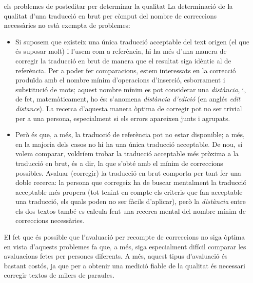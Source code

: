 \begin{persabermes}{els problemes de posteditar per determinar la qualitat}
  La determinació de la qualitat d'una traducció en brut per còmput
  del nombre de correccions necessàries no està exempta de problemes:
\begin{itemize}
\item Si suposem que existeix una única traducció acceptable del text
  origen (el que és suposar molt) i l'usem com a referència, hi ha més
  d'una manera de corregir la traducció en brut de manera que el
  resultat siga idèntic al de referència. Per a poder fer
  comparacions, estem interessats en la correcció produïda amb el
  nombre mínim d'operacions d'inserció, esborrament i substitució de
  mots; aquest nombre mínim es pot considerar una \emph{distància}, i,
  de fet, matemàticament, ho és: s'anomena \emph{distància d'edició}
  (en anglés \emph{edit distance}). La recerca d'aquesta manera òptima
  de corregir pot no ser trivial per a una persona, especialment si
  els errors apareixen junts i agrupats.
\item Però és que, a més, la traducció de referència pot no estar
  disponible; a més, en la majoria dels casos no hi ha una única
  traducció acceptable. De nou, si volem comparar, voldríem trobar la
  traducció acceptable més pròxima a la traducció en brut, és a dir,
  la que s'obté amb el mínim de correccions possibles. Avaluar
  (corregir) la traducció en brut comporta per tant fer una doble
  recerca: la persona que corregeix ha de buscar mentalment la
  traducció acceptable més propera (tot tenint en compte els criteris
  que fan acceptable una traducció, els quals poden no ser fàcils
  d'aplicar), però la \emph{distància} entre els dos textos també es
  calcula fent una recerca mental del nombre mínim de correccions
  necessàries.
\end{itemize}
El fet que és possible que l'avaluació per recompte de correccions no
siga òptima en vista d'aquests problemes fa que, a més, siga
especialment difícil comparar les avaluacions fetes per persones
diferents. A més, aquest tipus d'avaluació és bastant costós, ja que
per a obtenir una medició fiable de la qualitat és necessari corregir
textos de milers de paraules.  
\end{persabermes}

